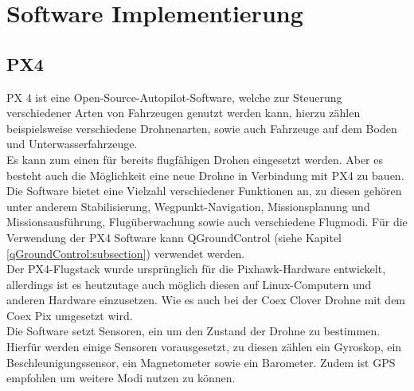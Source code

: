 \chapter{Software Implementierung}

\section{PX4} \label{px4:section}
PX 4 ist eine Open-Source-Autopilot-Software, welche zur Steuerung verschiedener Arten von Fahrzeugen genutzt werden kann, hierzu zählen beispielsweise verschiedene Drohnenarten, sowie auch Fahrzeuge auf dem Boden und Unterwasserfahrzeuge.\\ Es kann zum einen für bereits flugfähigen Drohen eingesetzt werden. Aber es besteht auch die Möglichkeit eine neue Drohne in Verbindung mit PX4 zu bauen.\\
Die Software bietet eine Vielzahl verschiedener Funktionen an, zu diesen gehören unter anderem Stabilisierung, Wegpunkt-Navigation, Missionsplanung und Missionsausführung, Flugüberwachung sowie auch verschiedene Flugmodi.
Für die Verwendung der PX4 Software kann QGroundControl (siehe Kapitel \ref{qGroundControl:subsection}) verwendet werden. \cite[vgl.][]{px4} \\
Der PX4-Flugstack wurde ursprünglich für die Pixhawk-Hardware entwickelt, allerdings ist es heutzutage auch möglich diesen auf Linux-Computern und anderen Hardware einzusetzen. Wie es auch bei der Coex Clover Drohne mit dem Coex Pix umgesetzt wird. \\
Die Software setzt Sensoren, ein um den Zustand der Drohne zu bestimmen. Hierfür werden einige Sensoren vorausgesetzt, zu diesen zählen ein Gyroskop, ein Beschleunigungssensor, ein Magnetometer sowie ein Barometer. Zudem ist GPS empfohlen um weitere Modi nutzen zu können. \cite[vgl.][]{px4}

